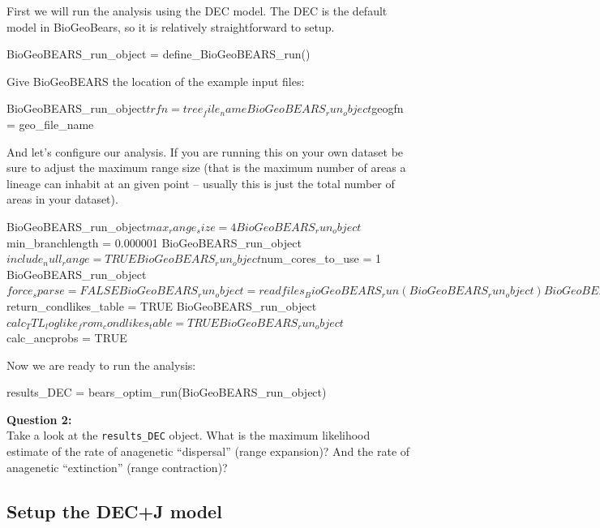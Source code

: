 \documentclass[11pt]{article}
\begin{document}
First we will run the analysis using the DEC model.
The DEC is the default model in BioGeoBears, so
it is relatively straightforward to setup.
\begin{code}
BioGeoBEARS_run_object = define_BioGeoBEARS_run()
\end{code}
Give BioGeoBEARS the location of the example input files:
\begin{code}
BioGeoBEARS_run_object$trfn = tree_file_name
BioGeoBEARS_run_object$geogfn = geo_file_name
\end{code}
And let's configure our analysis.
If you are running this on your own dataset be sure
to adjust the maximum range size (that is the maximum
number of areas a lineage can inhabit at an given point
-- usually this is just the total number of areas in your dataset).
\begin{code}
BioGeoBEARS_run_object$max_range_size = 4
BioGeoBEARS_run_object$min_branchlength = 0.000001 
BioGeoBEARS_run_object$include_null_range = TRUE
BioGeoBEARS_run_object$num_cores_to_use = 1
BioGeoBEARS_run_object$force_sparse = FALSE 
BioGeoBEARS_run_object = readfiles_BioGeoBEARS_run(BioGeoBEARS_run_object)
BioGeoBEARS_run_object$return_condlikes_table = TRUE
BioGeoBEARS_run_object$calc_TTL_loglike_from_condlikes_table = TRUE
BioGeoBEARS_run_object$calc_ancprobs = TRUE 
\end{code}
Now we are ready to run the analysis:
\begin{code}
results_DEC = bears_optim_run(BioGeoBEARS_run_object)
\end{code}

\begin{framed}
\noindent
\textbf{Question 2:} \\
Take a look at the \texttt{results\_DEC}
object. What is the maximum likelihood estimate
of the rate of anagenetic ``dispersal'' (range expansion)?
And the rate of anagenetic ``extinction'' (range contraction)?
\end{framed}


\subsection{Setup the DEC+J model}
\end{document}
